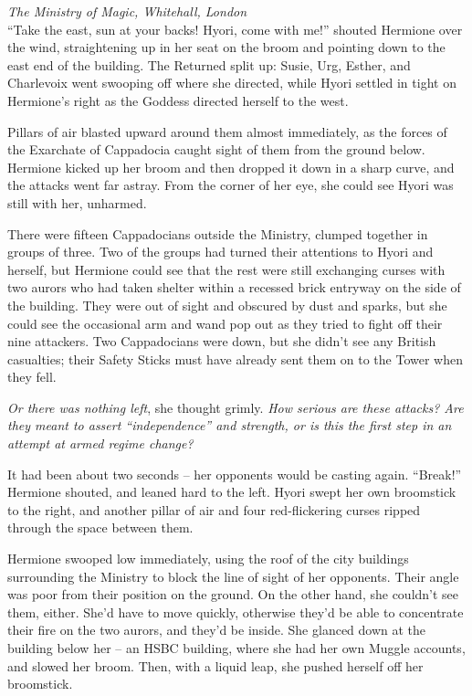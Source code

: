 \mybreak

\emph{The Ministry of Magic, Whitehall, London}\\

``Take the east, sun at your backs! Hyori, come with me!'' shouted
Hermione over the wind, straightening up in her seat on the broom and
pointing down to the east end of the building. The Returned split up:
Susie, Urg, Esther, and Charlevoix went swooping off where she directed,
while Hyori settled in tight on Hermione's right as the Goddess directed
herself to the west.

Pillars of air blasted upward around them almost immediately, as the
forces of the Exarchate of Cappadocia caught sight of them from the
ground below. Hermione kicked up her broom and then dropped it down in a
sharp curve, and the attacks went far astray. From the corner of her
eye, she could see Hyori was still with her, unharmed.

There were fifteen Cappadocians outside the Ministry, clumped together
in groups of three. Two of the groups had turned their attentions to
Hyori and herself, but Hermione could see that the rest were still
exchanging curses with two aurors who had taken shelter within a
recessed brick entryway on the side of the building. They were out of
sight and obscured by dust and sparks, but she could see the occasional
arm and wand pop out as they tried to fight off their nine attackers.
Two Cappadocians were down, but she didn't see any British casualties;
their Safety Sticks must have already sent them on to the Tower when
they fell.

\emph{Or there was nothing left}, she thought grimly. \emph{How serious
are these attacks? Are they meant to assert ``independence'' and
strength, or is this the first step in an attempt at armed regime
change?}

It had been about two seconds -- her opponents would be casting again.
``Break!'' Hermione shouted, and leaned hard to the left. Hyori swept
her own broomstick to the right, and another pillar of air and four
red-flickering curses ripped through the space between them.

Hermione swooped low immediately, using the roof of the city buildings
surrounding the Ministry to block the line of sight of her opponents.
Their angle was poor from their position on the ground. On the other
hand, she couldn't see them, either. She'd have to move quickly,
otherwise they'd be able to concentrate their fire on the two aurors,
and they'd be inside. She glanced down at the building below her -- an
HSBC building, where she had her own Muggle accounts, and slowed her
broom. Then, with a liquid leap, she pushed herself off her broomstick.

